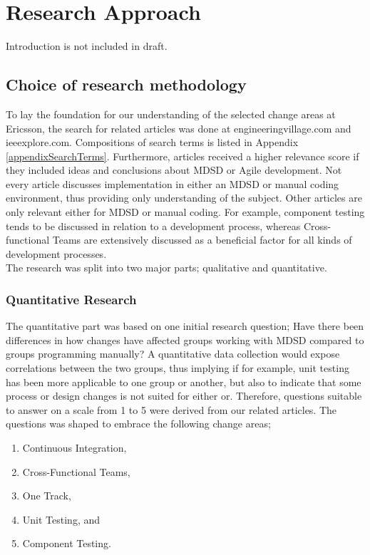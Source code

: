 \documentclass[final_report_innit.tex]{subfiles}
\begin{document}
\section{Research Approach}
Introduction is not included in draft.

\subsection{Choice of research methodology}
To lay the foundation for our understanding of the selected change areas at Ericsson, the search for related articles was done at engineeringvillage.com and ieeexplore.com. Compositions of search terms is listed in Appendix \ref{appendixSearchTerms}. Furthermore, articles received a higher relevance score if they included ideas and conclusions about MDSD or Agile development. Not every article discusses implementation in either an MDSD or manual coding environment, thus providing only understanding of the subject. Other articles are only relevant either for MDSD or manual coding. For example, component testing tends to be discussed in relation to a development process, whereas Cross-functional Teams are extensively discussed as a beneficial factor for all kinds of development processes.
\\

The research was split into two major parts; qualitative and quantitative.
\\
\subsubsection{Quantitative Research}
The quantitative part was based on one initial research question; Have there been differences in how changes have affected groups working with MDSD compared to groups programming manually? A quantitative data collection would expose correlations between the two groups, thus implying if for example, unit testing has been more applicable to one group or another, but also to indicate that some process or design changes is not suited for either or. Therefore, questions suitable to answer on a scale from 1 to 5 were derived from our related articles. The questions was shaped to embrace the following change areas;
\\
\begin{enumerate}
	\item Continuous Integration,
	\item Cross-Functional Teams,
	\item One Track,
	\item Unit Testing, and
	\item Component Testing. \\ %
\end{enumerate}
\end{document}
